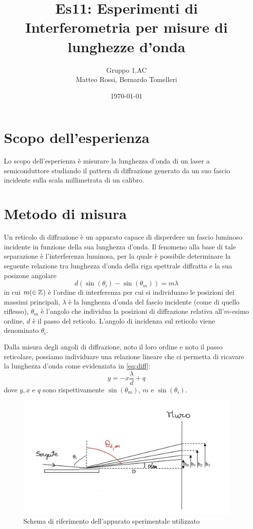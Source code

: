 \documentclass[10pt, a4paper, italian]{article}
\author{Gruppo 1.AC \\ Matteo Rossi, Bernardo Tomelleri}
\title{Es11: Esperimenti di Interferometria per misure di lunghezze d'onda}
\begin{document}
\date{\today}
\maketitle

\section{Scopo dell'esperienza}
Lo scopo dell'esperienza è misurare la lunghezza d'onda di un laser
a semiconduttore studiando il pattern di diffrazione generato da un suo
fascio incidente sulla scala millimetrata di un calibro.

\section{Metodo di misura}
Un reticolo di diffrazione è un apparato capace di disperdere un fascio
luminoso incidente in funzione della sua lunghezza d'onda. Il fenomeno alla
base di tale separazione è l'interferenza luminosa, per la quale è possibile
determinare la seguente relazione tra lunghezza d'onda della riga spettrale
diffratta e la sua posizone angolare
\begin{equation}
d(\sin(\theta _i) - \sin(\theta _m)) = m \lambda
\label{eq:diff}
\end{equation}
in cui $m (\in \mathbb Z$) è l'ordine di interferenza per cui si individuano le
posizioni dei massimi principali, $\lambda$ è la lunghezza d'onda del fascio
incidente (come di quello riflesso), $\theta _m$ è l'angolo che
individua la posizioni di diffrazione relativa all'$m$-esimo ordine, $d$ è il
passo del reticolo.
L'angolo di incidenza sul reticolo viene denominato $\theta _i$.

Dalla misura degli angoli di diffrazione, noto il loro ordine e noto il passo
reticolare, possiamo individuare una relazione lineare che ci permetta di
ricavare la lunghezza d'onda come evidenziata in \ref{eq:diff}:
\begin{equation}
y = -x \frac{\lambda}{d} + q
\label{eq:fit}
\end{equation}
dove $y,x$ e $q$ sono rispettivamente $\sin(\theta _m)$, $m$ e
$\sin(\theta _i)$.

\begin{figure}
\includegraphics[width=\textwidth]{0}
\caption{Schema di riferimento dell'apparato sperimentale utilizzato
\label{fig: schema}}
\end{figure}
\end{document}
